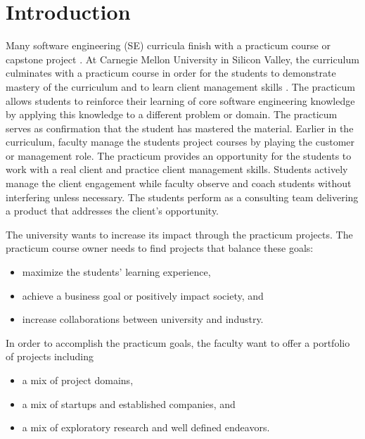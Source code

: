 \section{Introduction}
\label{Introduction}

Many software engineering (SE) curricula finish with a practicum course
or capstone project \cite{GSWE}. At Carnegie Mellon
University in Silicon Valley, the curriculum culminates with a practicum
course in order for the students to demonstrate mastery of the
curriculum and to learn client management skills
\cite{Katz}. The practicum allows students to reinforce
their learning of core software engineering knowledge by applying this
knowledge to a different problem or domain. The practicum serves as
confirmation that the student has mastered the material. Earlier in the
curriculum, faculty manage the students project courses by playing the
customer or management role. The practicum provides an opportunity for
the students to work with a real client and practice client management
skills. Students actively manage the client engagement while faculty
observe and coach students without interfering unless necessary. The
students perform as a consulting team delivering a product that addresses the client's opportunity.

The university wants to increase its impact through the practicum
projects. The practicum course owner needs to find projects that
balance these goals:

\begin{itemize}
\itemsep1pt\parskip0pt
\item
  maximize the students' learning experience, 
\item
  achieve a business goal or positively impact society, and
\item
  increase collaborations between university and industry. 
\end{itemize}

In order to accomplish the practicum goals, the faculty want to offer
a portfolio of projects including

\begin{itemize}
\itemsep1pt\parskip0pt
\item
  a mix of project domains,
\item
  a mix of startups and established companies, and 
\item
  a mix of exploratory research and well defined
  endeavors.
\end{itemize}

